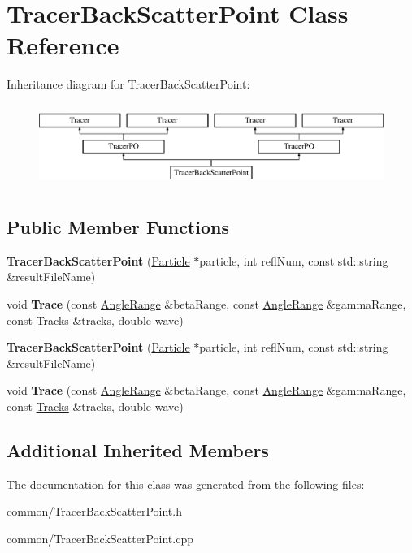 \hypertarget{class_tracer_back_scatter_point}{}\section{Tracer\+Back\+Scatter\+Point Class Reference}
\label{class_tracer_back_scatter_point}
Inheritance diagram for Tracer\+Back\+Scatter\+Point\+:\begin{figure}[H]
\begin{center}
\leavevmode
\includegraphics[height=2.727273cm]{class_tracer_back_scatter_point}
\end{center}
\end{figure}
\subsection*{Public Member Functions}
\begin{DoxyCompactItemize}
\item 
\mbox{\label{class_tracer_back_scatter_point_a19a45ca1758bc87861b28bec20b9c9eb}} 
{\bfseries Tracer\+Back\+Scatter\+Point} (\mbox{\hyperlink{class_particle}{Particle}} $\ast$particle, int refl\+Num, const std\+::string \&result\+File\+Name)
\item 
\mbox{\label{class_tracer_back_scatter_point_a2db2b1225db5a2cc6e4e8cd436e49ac9}} 
void {\bfseries Trace} (const \mbox{\hyperlink{struct_angle_range}{Angle\+Range}} \&beta\+Range, const \mbox{\hyperlink{struct_angle_range}{Angle\+Range}} \&gamma\+Range, const \mbox{\hyperlink{class_tracks}{Tracks}} \&tracks, double wave)
\item 
\mbox{\label{class_tracer_back_scatter_point_a19a45ca1758bc87861b28bec20b9c9eb}} 
{\bfseries Tracer\+Back\+Scatter\+Point} (\mbox{\hyperlink{class_particle}{Particle}} $\ast$particle, int refl\+Num, const std\+::string \&result\+File\+Name)
\item 
\mbox{\label{class_tracer_back_scatter_point_a2db2b1225db5a2cc6e4e8cd436e49ac9}} 
void {\bfseries Trace} (const \mbox{\hyperlink{struct_angle_range}{Angle\+Range}} \&beta\+Range, const \mbox{\hyperlink{struct_angle_range}{Angle\+Range}} \&gamma\+Range, const \mbox{\hyperlink{class_tracks}{Tracks}} \&tracks, double wave)
\end{DoxyCompactItemize}
\subsection*{Additional Inherited Members}


The documentation for this class was generated from the following files\+:\begin{DoxyCompactItemize}
\item 
common/Tracer\+Back\+Scatter\+Point.\+h\item 
common/Tracer\+Back\+Scatter\+Point.\+cpp\end{DoxyCompactItemize}
